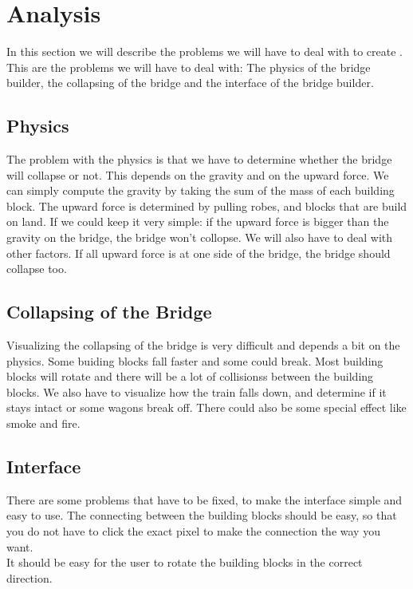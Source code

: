 \section{Analysis}
In this section we will describe the problems we will have to deal with to create \name. This are the problems we will have to deal with: The physics of the bridge builder, the collapsing of the bridge and the interface of the bridge builder.
\subsection{Physics}
The problem with the physics is that we have to determine whether the bridge will collapse or not. This depends on the gravity and on the upward force. We can simply compute the gravity by taking the sum of the mass of each building block. The upward force is determined by pulling robes, and blocks that are build on land.  If we could keep it very simple: if the upward force is bigger than the gravity on the bridge, the bridge won't collopse. We will also have to deal with other factors. If all upward force is at one side of the bridge, the bridge should collapse too. 
\subsection{Collapsing of the Bridge}
Visualizing the collapsing of the bridge is very difficult and depends a bit on the physics. Some buiding blocks fall faster and some could break. Most building blocks will rotate and there will be a lot of collisionss between the building blocks. We also have to visualize how the train falls down, and determine if it stays intact or some wagons break off. There could also be some special effect like smoke and fire. 
\subsection{Interface}
There are some problems that have to be fixed, to make the interface simple and easy to use. The connecting between the building blocks should be easy, so that you do not have to click the exact pixel to make the connection  the way you want. \\
It should be easy for the user to rotate the building blocks in the correct direction. \\
